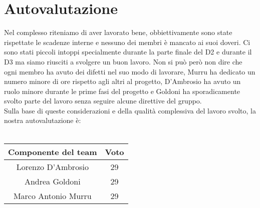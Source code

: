 \section{Autovalutazione}
Nel complesso riteniamo di aver lavorato bene, obbiettivamente sono state rispettate le scadenze interne e nessuno dei membri è mancato ai suoi doveri. Ci sono stati piccoli intoppi specialmente durante la parte finale del D2 e durante il D3 ma siamo riusciti a svolgere un buon lavoro. Non si può però non dire che ogni membro ha avuto dei difetti nel suo modo di lavorare, Murru ha dedicato un numero minore di ore rispetto agli altri al progetto, D'Ambrosio ha avuto un ruolo minore durante le prime fasi del progetto e Goldoni ha sporadicamente svolto parte del lavoro senza seguire alcune direttive del gruppo. \\
Sulla base di queste considerazioni e della qualità complessiva del lavoro svolto, la nostra autovalutazione è: 
\\
\\
\begin{tabular}{ |c|c| } 
 \hline
 \textbf{Componente del team} & \textbf{Voto} \\
 \hline
 Lorenzo D'Ambrosio & 29 \\ 
 \hline
 Andrea Goldoni & 29 \\ 
 \hline
 Marco Antonio Murru & 29  \\ 
 \hline
\end{tabular}